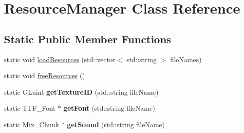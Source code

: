 \hypertarget{class_resource_manager}{\section{Resource\-Manager Class Reference}
\label{class_resource_manager}
}
\subsection*{Static Public Member Functions}
\begin{DoxyCompactItemize}
\item 
static void \hyperlink{class_resource_manager_ab5a7ff1c8569def2d72f8ad345f39acf}{load\-Resources} (std\-::vector$<$ std\-::string $>$ file\-Names)
\item 
static void \hyperlink{class_resource_manager_ac3c00f46cc2cb9362433f80b356e7255}{free\-Resources} ()
\item 
\hypertarget{class_resource_manager_a0122e77beb55dd09615ea8ab143637f7}{static G\-Luint {\bfseries get\-Texture\-I\-D} (std\-::string file\-Name)}\label{class_resource_manager_a0122e77beb55dd09615ea8ab143637f7}

\item 
\hypertarget{class_resource_manager_a5ab373ff971ce36085fff283d5f0a21b}{static T\-T\-F\-\_\-\-Font $\ast$ {\bfseries get\-Font} (std\-::string file\-Name)}\label{class_resource_manager_a5ab373ff971ce36085fff283d5f0a21b}

\item 
\hypertarget{class_resource_manager_abf4f14a00b590ef80019590ebad17a6c}{static Mix\-\_\-\-Chunk $\ast$ {\bfseries get\-Sound} (std\-::string file\-Name)}\label{class_resource_manager_abf4f14a00b590ef80019590ebad17a6c}

\end{DoxyCompactItemize}


